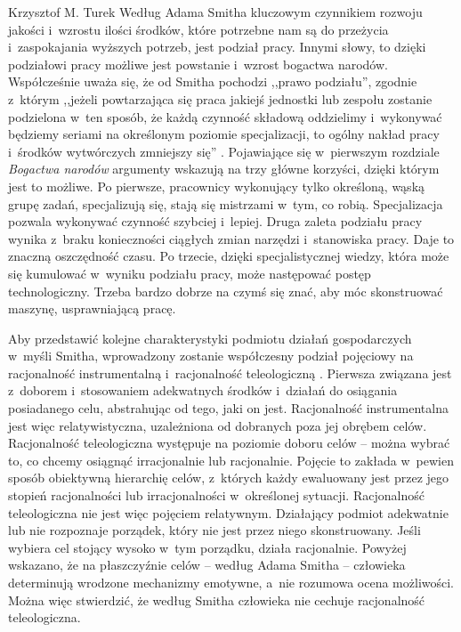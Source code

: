 \begin{artplenv}{Krzysztof M. Turek}
Według Adama Smitha kluczowym czynnikiem rozwoju jakości i~wzrostu ilości środków, które potrzebne nam są do
przeżycia i~zaspokajania wyższych potrzeb, jest podział pracy. Innymi słowy, to dzięki podziałowi pracy możliwe
jest powstanie i~wzrost bogactwa narodów.
Współcześnie uważa się, że od Smitha pochodzi ,,prawo podziału'', zgodnie z~którym ,,jeżeli powtarzająca się praca jakiejś
jednostki lub zespołu zostanie podzielona w~ten sposób, że każdą czynność składową oddzielimy i~wykonywać będziemy
seriami na określonym poziomie specjalizacji, to ogólny nakład pracy i~środków wytwórczych zmniejszy się''
\parencite{bielski_organizacje:_1997}.
Pojawiające się w~pierwszym rozdziale \textit{Bogactwa narodów} argumenty wskazują na
trzy główne korzyści, dzięki którym jest to możliwe. Po pierwsze, pracownicy wykonujący tylko określoną, wąską grupę
zadań, specjalizują się, stają się mistrzami w~tym, co robią. Specjalizacja pozwala wykonywać czynność
szybciej i~lepiej. Druga zaleta podziału pracy wynika z~braku konieczności ciągłych zmian narzędzi i~stanowiska pracy. Daje to
znaczną oszczędność czasu. Po trzecie, dzięki specjalistycznej wiedzy, która może się kumulować w~wyniku podziału
pracy, może następować postęp technologiczny. Trzeba bardzo dobrze na czymś się znać, aby móc skonstruować maszynę,
usprawniającą pracę.

Aby przedstawić kolejne charakterystyki podmiotu działań gospodarczych w~myśli Smitha,
wprowadzony zostanie współczesny podział pojęciowy na racjonalność instrumentalną i~racjonalność teleologiczną
\parencite[s.~12]{bochenek_problem_1999}.
Pierwsza związana jest z~doborem i~stosowaniem adekwatnych
środków i~działań do osiągania posiadanego celu, abstrahując od tego, jaki on jest. Racjonalność instrumentalna jest
więc relatywistyczna, uzależniona od dobranych poza jej obrębem celów. Racjonalność teleologiczna występuje na poziomie
doboru celów -- można wybrać to, co chcemy osiągnąć irracjonalnie lub racjonalnie. Pojęcie to zakłada w~pewien sposób
obiektywną hierarchię celów, z~których każdy ewaluowany jest przez jego stopień racjonalności lub
irracjonalności w~określonej sytuacji. Racjonalność teleologiczna nie jest więc pojęciem relatywnym.
Działający podmiot adekwatnie lub
nie rozpoznaje porządek, który nie jest przez niego skonstruowany. Jeśli wybiera cel stojący wysoko w~tym porządku, działa
racjonalnie. Powyżej wskazano, że na płaszczyźnie celów -- według Adama Smitha -- człowieka determinują wrodzone
mechanizmy emotywne, a~nie rozumowa ocena możliwości. Można więc stwierdzić, że według Smitha człowieka nie cechuje
racjonalność teleologiczna.


\end{artplenv}
